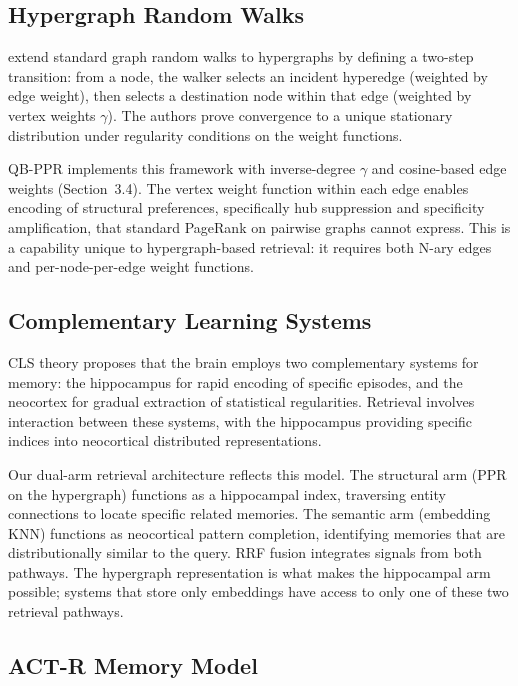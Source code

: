 \documentclass[11pt,a4paper]{article}
\begin{document}
\subsection{Hypergraph Random Walks}

\citet{chitra2019random} extend standard graph random walks to hypergraphs by defining a two-step transition: from a node, the walker selects an incident hyperedge (weighted by edge weight), then selects a destination node within that edge (weighted by vertex weights $\gamma$). The authors prove convergence to a unique stationary distribution under regularity conditions on the weight functions.

QB-PPR implements this framework with inverse-degree $\gamma$ and cosine-based edge weights (Section~3.4). The vertex weight function within each edge enables encoding of structural preferences, specifically hub suppression and specificity amplification, that standard PageRank on pairwise graphs cannot express. This is a capability unique to hypergraph-based retrieval: it requires both N-ary edges and per-node-per-edge weight functions.

\subsection{Complementary Learning Systems}

CLS theory \citep{mcclelland1995cls} proposes that the brain employs two complementary systems for memory: the hippocampus for rapid encoding of specific episodes, and the neocortex for gradual extraction of statistical regularities. Retrieval involves interaction between these systems, with the hippocampus providing specific indices into neocortical distributed representations.

Our dual-arm retrieval architecture reflects this model. The structural arm (PPR on the hypergraph) functions as a hippocampal index, traversing entity connections to locate specific related memories. The semantic arm (embedding KNN) functions as neocortical pattern completion, identifying memories that are distributionally similar to the query. RRF fusion integrates signals from both pathways. The hypergraph representation is what makes the hippocampal arm possible; systems that store only embeddings have access to only one of these two retrieval pathways.

\subsection{ACT-R Memory Model}
\end{document}

